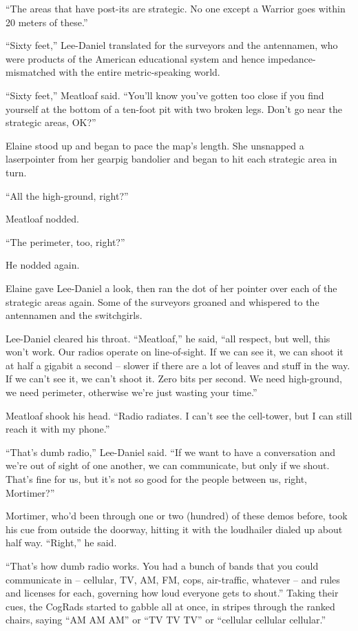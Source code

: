 “The areas that have post-its are strategic. No one except a Warrior 
goes within 20 meters of these.”

“Sixty feet,” Lee-Daniel translated for the surveyors and the 
antennamen, who were products of the American educational system and 
hence impedance-mismatched with the entire metric-speaking world.

“Sixty feet,” Meatloaf said. “You'll know you've gotten too close 
if you find yourself at the bottom of a ten-foot pit with two broken 
legs. Don't go near the strategic areas, OK?”

Elaine stood up and began to pace the map's length. She unsnapped a 
laserpointer from her gearpig bandolier and began to hit each strategic 
area in turn.

“All the high-ground, right?”

Meatloaf nodded.

“The perimeter, too, right?”

He nodded again.

Elaine gave Lee-Daniel a look, then ran the dot of her pointer over 
each of the strategic areas again. Some of the surveyors groaned and 
whispered to the antennamen and the switchgirls.

Lee-Daniel cleared his throat. “Meatloaf,” he said, “all respect, 
but well, this won't work. Our radios operate on line-of-sight. If we 
can see it, we can shoot it at half a gigabit a second -- slower if 
there are a lot of leaves and stuff in the way. If we can't see it, we 
can't shoot it. Zero bits per second. We need high-ground, we need 
perimeter, otherwise we're just wasting your time.”

Meatloaf shook his head. “Radio radiates. I can't see the cell-tower, 
but I can still reach it with my phone.”

“That's dumb radio,” Lee-Daniel said. “If we want to have a 
conversation and we're out of sight of one another, we can communicate, 
but only if we shout. That's fine for us, but it's not so good for the 
people between us, right, Mortimer?”

Mortimer, who'd been through one or two (hundred) of these demos 
before, took his cue from outside the doorway, hitting it with the 
loudhailer dialed up about half way. “Right,” he said.

“That's how dumb radio works. You had a bunch of bands that you could 
communicate in -- cellular, TV, AM, FM, cops, air-traffic, whatever -- 
and rules and licenses for each, governing how loud everyone gets to 
shout.” Taking their cues, the CogRads started to gabble all at once, 
in stripes through the ranked chairs, saying “AM AM AM” or “TV TV 
TV” or “cellular cellular cellular.”

